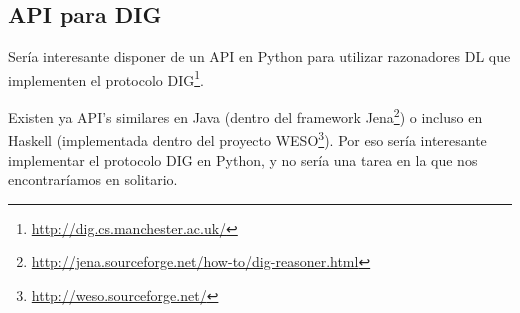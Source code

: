 \subsection*{API para DIG}

Sería interesante disponer de un API en Python para utilizar razonadores DL que implementen 
el protocolo DIG\footnote{\url{http://dig.cs.manchester.ac.uk/}}. 

Existen ya API's similares en Java (dentro del framework
Jena\footnote{\url{http://jena.sourceforge.net/how-to/dig-reasoner.html}}) o incluso en Haskell 
(implementada dentro del proyecto WESO\footnote{\url{http://weso.sourceforge.net/}}). Por eso 
sería interesante implementar el protocolo DIG en Python, y no sería una tarea
en la que nos encontraríamos en solitario\cite{PythonOWL}.

